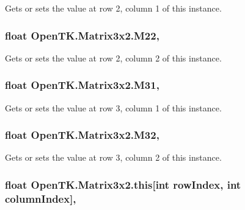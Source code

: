 Gets or sets the value at row 2, column 1 of this instance. 

\hypertarget{struct_open_t_k_1_1_matrix3x2_a373be87c7c248ed56a1a56fd5f0a8d94}{
\subsubsection[{M22}]{\setlength{\rightskip}{0pt plus 5cm}float Open\-T\-K.\-Matrix3x2.\-M22\hspace{0.3cm}{\ttfamily [get]}, {\ttfamily [set]}}}\label{struct_open_t_k_1_1_matrix3x2_a373be87c7c248ed56a1a56fd5f0a8d94}


Gets or sets the value at row 2, column 2 of this instance. 

\hypertarget{struct_open_t_k_1_1_matrix3x2_a83b5221557ba7fd25b9d590973578156}{
\subsubsection[{M31}]{\setlength{\rightskip}{0pt plus 5cm}float Open\-T\-K.\-Matrix3x2.\-M31\hspace{0.3cm}{\ttfamily [get]}, {\ttfamily [set]}}}\label{struct_open_t_k_1_1_matrix3x2_a83b5221557ba7fd25b9d590973578156}


Gets or sets the value at row 3, column 1 of this instance. 

\hypertarget{struct_open_t_k_1_1_matrix3x2_abac8e7ce5710ff968911a4c2e9405bb6}{
\subsubsection[{M32}]{\setlength{\rightskip}{0pt plus 5cm}float Open\-T\-K.\-Matrix3x2.\-M32\hspace{0.3cm}{\ttfamily [get]}, {\ttfamily [set]}}}\label{struct_open_t_k_1_1_matrix3x2_abac8e7ce5710ff968911a4c2e9405bb6}


Gets or sets the value at row 3, column 2 of this instance. 

\hypertarget{struct_open_t_k_1_1_matrix3x2_a54506beefaa89d50f476ae06e9383040}{
\subsubsection[{this[int row\-Index, int column\-Index]}]{\setlength{\rightskip}{0pt plus 5cm}float Open\-T\-K.\-Matrix3x2.\-this\mbox{[}int row\-Index, int column\-Index\mbox{]}\hspace{0.3cm}{\ttfamily [get]}, {\ttfamily [set]}}}\label{struct_open_t_k_1_1_matrix3x2_a54506beefaa89d50f476ae06e9383040}


